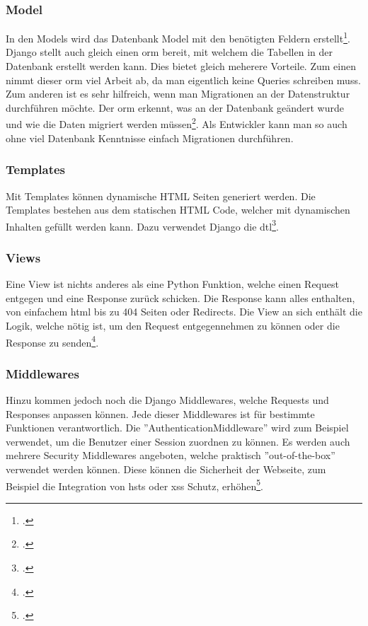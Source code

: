 \subsubsection*{Model}
In den Models wird das Datenbank Model mit den benötigten Feldern erstellt\footcite{django_models}. Django stellt auch gleich einen \gls{orm} bereit, mit welchem die Tabellen in der Datenbank erstellt werden kann. Dies bietet gleich meherere Vorteile. Zum einen nimmt dieser \gls{orm} viel Arbeit ab, da man eigentlich keine Queries schreiben muss. Zum anderen ist es sehr hilfreich, wenn man Migrationen an der Datenstruktur durchführen möchte. Der \gls{orm} erkennt, was an der Datenbank geändert wurde und wie die Daten migriert werden müssen\footcite{django_manage}. Als Entwickler kann man so auch ohne viel Datenbank Kenntnisse einfach Migrationen durchführen.

\subsubsection*{Templates}
Mit Templates können dynamische HTML Seiten generiert werden. Die Templates bestehen aus dem statischen HTML Code, welcher mit dynamischen Inhalten gefüllt werden kann.  Dazu verwendet Django die \gls{dtl}\footcite{django_templates}.

\subsubsection*{Views}
Eine View ist nichts anderes als eine Python Funktion, welche einen Request entgegen und eine Response zurück schicken. Die Response kann alles enthalten, von einfachem \gls{html} bis zu 404 Seiten oder Redirects. Die View an sich enthält die Logik, welche nötig ist, um den Request entgegennehmen zu können oder die Response zu senden\footcite{django_views}.

\subsubsection*{Middlewares}
Hinzu kommen jedoch noch die Django Middlewares, welche Requests und Responses anpassen können. Jede dieser Middlewares ist für bestimmte Funktionen verantwortlich. Die ''AuthenticationMiddleware'' wird zum Beispiel verwendet, um die Benutzer einer Session zuordnen zu können. Es werden auch mehrere Security Middlewares angeboten, welche praktisch ''out-of-the-box'' verwendet werden können. Diese können die Sicherheit der Webseite, zum Beispiel die Integration von \gls{hsts} oder \gls{xss} Schutz, erhöhen\footcite{django_middlewares}.\\


